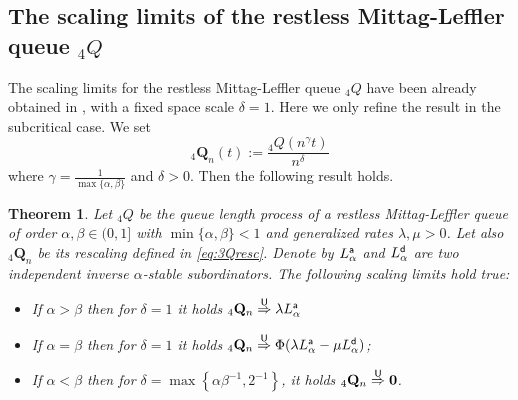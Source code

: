 \documentclass[]{amsart}
\numberwithin{equation}{section}
\newtheorem{thm}{Theorem}[section]
\theoremstyle{remark}
\theoremstyle{definition}
\begin{document}
\subsection{The scaling limits of the restless Mittag-Leffler queue ${}_4Q$}
The scaling limits for the restless Mittag-Leffler queue ${}_4Q$ have been already obtained in \cite[Theorem 3.3]{butt2023queuing}, with a fixed space scale $\delta=1$. Here we only refine the result in the subcritical case. We set
\begin{equation}\label{eq:3Qresc}
	{}_4\mathbf{Q}_n(t):=\frac{{}_4Q(n^\gamma t)}{n^\delta}
\end{equation}
where $\gamma=\frac{1}{\max\{\alpha,\beta\}}$ and $\delta>0$. Then the following result holds.
%
%
\begin{thm}\label{thm:limits3Q}
Let ${}_4Q$ be the queue length process of a restless Mittag-Leffler queue of order $\alpha,\beta \in (0,1]$ with $\min\{\alpha,\beta\}<1$ and generalized rates $\lambda,\mu>0$. Let also ${}_4\mathbf{Q}_n$ be its rescaling defined in \eqref{eq:3Qresc}. Denote by $L_\alpha^{\sf a}$ and $L^{\sf d}_{\alpha}$ are two independent inverse $\alpha$-stable subordinators. The following scaling limits hold true:
\begin{itemize}
	\item[$(i)$] If $\alpha>\beta$ then for $\delta=1$ it holds ${}_4\mathbf{Q}_n \overset{\sf U}{\Rightarrow} \lambda L^{\sf a}_\alpha$
	\item[$(ii)$] If $\alpha=\beta$ then for $\delta=1$ it holds ${}_4\mathbf{Q}_n \overset{\sf U}{\Rightarrow} \Phi(\lambda L^{\sf a}_\alpha-\mu L^{\sf d}_\alpha)$;	
	\item[$(iii)$] If $\alpha<\beta$ then for $\delta=\max \left\{\alpha\beta^{-1},2^{-1}\right\}$, it holds ${}_4\mathbf{Q}_n \overset{\sf U}{\Rightarrow} \mathbf{0}$.
\end{itemize}	
\end{thm}
\end{document}
